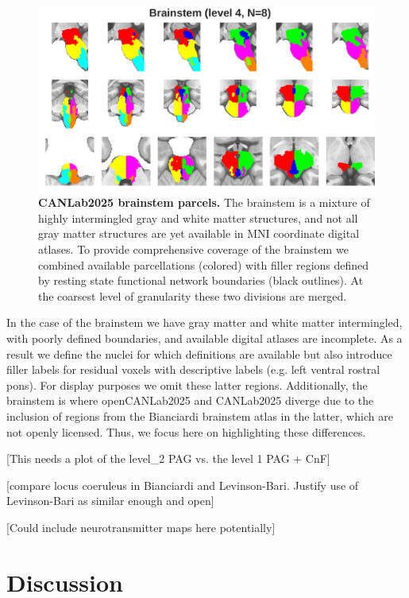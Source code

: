 \documentclass[10pt,letterpaper]{article}
\begin{document}
\begin{figure}[t]
\begin{minipage}{\linewidth}
\end{minipage}
\begin{minipage}{\linewidth}
\includegraphics[width=\linewidth]{images/bstem_coarsest.png}
\end{minipage}
\caption{
{\bf
CANLab2025 brainstem parcels.} The brainstem is a mixture of highly intermingled gray and white matter structures, and not all gray matter structures are yet available in MNI coordinate digital atlases. To provide comprehensive coverage of the brainstem we combined available parcellations (colored) with filler regions defined by resting state functional network boundaries (black outlines). At the coarsest level of granularity these two divisions are merged.
}
\label{brainstem-granularities-figure}
\end{figure}

In the case of the brainstem we have gray matter and white matter intermingled, with poorly defined boundaries, and available digital atlases are incomplete. As a result we define the nuclei for which definitions are available but also introduce filler labels for residual voxels with descriptive labels (e.g. left ventral rostral pons). For display purposes we omit these latter regions. Additionally, the brainstem is where openCANLab2025 and CANLab2025 diverge due to the inclusion of regions from the Bianciardi brainstem atlas in the latter, which are not openly licensed. Thus, we focus here on highlighting these differences.

[This needs a plot of the level\_2 PAG vs. the level 1 PAG + CnF]

[compare locus coeruleus in Bianciardi and Levinson-Bari. Justify use of Levinson-Bari as similar enough and open]

[Could include neurotransmitter maps here potentially]


\section{Discussion}
\end{document}
